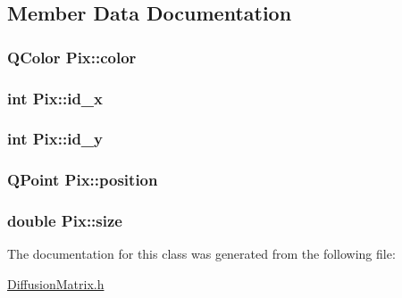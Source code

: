 \subsection{Member Data Documentation}
\hypertarget{class_pix_adb434da0394ea10d83bbd65982720ef1}{
\subsubsection[{color}]{\setlength{\rightskip}{0pt plus 5cm}Q\+Color Pix\+::color}}\label{class_pix_adb434da0394ea10d83bbd65982720ef1}
\hypertarget{class_pix_a277b6fbe5c42043d58493de50c9b12fc}{
\subsubsection[{id\+\_\+x}]{\setlength{\rightskip}{0pt plus 5cm}int Pix\+::id\+\_\+x}}\label{class_pix_a277b6fbe5c42043d58493de50c9b12fc}
\hypertarget{class_pix_a5fcf097e21af62c9fe0d989c0dd97c08}{
\subsubsection[{id\+\_\+y}]{\setlength{\rightskip}{0pt plus 5cm}int Pix\+::id\+\_\+y}}\label{class_pix_a5fcf097e21af62c9fe0d989c0dd97c08}
\hypertarget{class_pix_aa8c4ee0a6267df92adc58a0607eec53d}{
\subsubsection[{position}]{\setlength{\rightskip}{0pt plus 5cm}Q\+Point Pix\+::position}}\label{class_pix_aa8c4ee0a6267df92adc58a0607eec53d}
\hypertarget{class_pix_aaac7fdd5128a92819572c41b2e89c736}{
\subsubsection[{size}]{\setlength{\rightskip}{0pt plus 5cm}double Pix\+::size}}\label{class_pix_aaac7fdd5128a92819572c41b2e89c736}


The documentation for this class was generated from the following file\+:\begin{DoxyCompactItemize}
\item 
\hyperlink{_diffusion_matrix_8h}{Diffusion\+Matrix.\+h}\end{DoxyCompactItemize}
